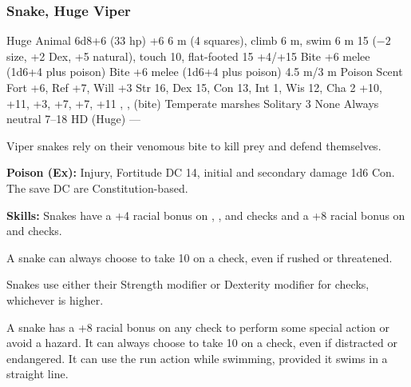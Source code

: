 \subsubsection{Snake, Huge Viper}
\begin{MonsterStats}
{Huge Animal}
{6d8+6 (33 hp)}
{+6}
{6 m (4 squares), climb 6 m, swim 6 m}
{15 ($-2$ size, +2 Dex, +5 natural), touch 10, flat-footed 15}
{+4/+15}
{Bite +6 melee (1d6+4 plus poison)}
{Bite +6 melee (1d6+4 plus poison)}
{4.5 m/3 m}
{Poison}
{Scent}
{Fort +6, Ref +7, Will +3}
{Str 16, Dex 15, Con 13, Int 1, Wis 12, Cha 2}
{ +10,  +11,  +3,  +7,  +7,  +11}
{, ,  (bite)}
{Temperate marshes}
{Solitary}
{3}
{None}
{Always neutral}
{7--18 HD (Huge)}
{---}
\end{MonsterStats}


Viper snakes rely on their venomous bite to kill prey and defend themselves.

\textbf{Poison (Ex):} Injury, Fortitude DC 14, initial and secondary damage 1d6 Con. The save DC are Constitution-based.

\textbf{Skills:} Snakes have a +4 racial bonus on , , and  checks and a +8 racial bonus on  and  checks.

A snake can always choose to take 10 on a  check, even if rushed or threatened.

Snakes use either their Strength modifier or Dexterity modifier for  checks, whichever is higher.

A snake has a +8 racial bonus on any  check to perform some special action or avoid a hazard. It can always choose to take 10 on a  check, even if distracted or endangered. It can use the run action while swimming, provided it swims in a straight line.
